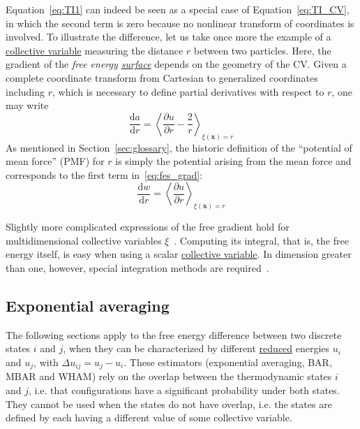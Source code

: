\documentclass[9pt,review]{livecoms}
\newcommand{\vx}{\mathbf{x}}
\begin{document}
Equation~\ref{eq:TI1} can indeed be seen as a special case of Equation~\ref{eq:TI_CV}, in which the second term is zero because no nonlinear transform of coordinates is involved. To illustrate the difference, let us take once more the example of a \hyperlink{ref:CV} {collective variable} measuring the distance $r$ between two particles. Here, the gradient of the \textit{free energy \hyperlink{ref:FES} {surface}} depends on the geometry of the CV. Given a complete coordinate transform from Cartesian to generalized coordinates including $r$, which is necessary to define partial derivatives with respect to $r$, one may write~\cite{Henin2010a}
\begin{equation}
    \frac{\mathrm{d}a}{\mathrm{d}r} = \left\langle \frac{\partial u}{\partial r}
    - \frac{2}{r} \right\rangle_{\xi(\vx) = r}
    \label{eq:fes_grad}
\end{equation}
As mentioned in Section~\ref{sec:glossary}, the historic definition of the ``potential of mean force'' (PMF) for $r$ is simply the potential arising from the mean force and corresponds to the first term in~\ref{eq:fes_grad}:
\begin{equation}
    \frac{\mathrm{d} w}{\mathrm{d} r} = \left\langle \frac{\partial u}{\partial r} \right\rangle_{\xi(\vx) = r}
    \label{eq:pmf_grad}
\end{equation}

Slightly more complicated expressions of the free gradient hold for multidimensional collective variables $\xi$~\cite{Carter1989, denOtter2000, Henin2004, Ciccotti2005, lelievre-rousset-stoltz-07-a, Darve2008, Lesage2017}. Computing its integral, that is, the free energy itself, is easy when using a scalar \hyperlink{ref:CV} {collective variable}. In dimension greater than one, however, special integration methods are required~\cite{Henin2021integration}.


\subsection{Exponential averaging}
\label{sec:fe_estimators:EXP}

The following sections apply to the free energy difference between two discrete states $i$ and $j$, when they can be characterized by different \hyperlink{ref:reduced} {reduced} energies $u_i$ and $u_j$, with $\Delta u_{ij} = u_j - u_i$.
These estimators (exponential averaging, BAR, MBAR and WHAM) rely on the overlap between the thermodynamic states $i$ and $j$, i.e. that configurations have a significant probability under both states. They cannot be used when the states do not have overlap, i.e. the states are defined by each having a different value of some collective variable. 
\end{document}
